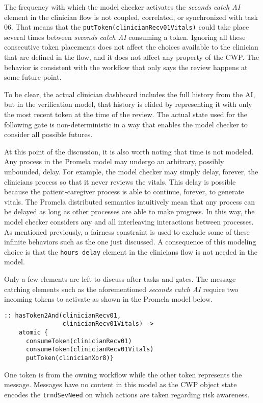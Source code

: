 The frequency with which the model checker activates the \emph{seconds catch AI} element in the clinician flow is not coupled, correlated, or synchronized with task 06.
That means that the \texttt{putToken(clinicianRecv01Vitals)} could take place several times between \emph{seconds catch AI} consuming a token.
Ignoring all these consecutive token placements does not affect the choices available to the clinician that are defined in the flow, and it does not affect any property of the CWP.
The behavior is consistent with the workflow that only says the review happens at some future point.

To be clear, the actual clinician dashboard includes the full history from the AI, but in the verification model, that history is elided by representing it with only the most recent token at the time of the review.
The actual state used for the following gate is non-deterministic in a way that enables the model checker to consider all possible futures.

At this point of the discussion, it is also worth noting that time is not modeled.
Any process in the Promela model may undergo an arbitrary, possibly unbounded, delay.
For example, the model checker may simply delay, forever, the clinicians process so that it never reviews the vitals.
This delay is possible because the patient-caregiver process is able to continue, forever, to generate vitals.
The Promela distributed semantics intuitively mean that any process can be delayed as long as other processes are able to make progress.
In this way, the model checker considers any and all interleaving interactions between processes.
As mentioned previously, a fairness constraint is used to exclude some of these infinite behaviors such as the one just discussed.
A consequence of this modeling choice is that the \texttt{hours delay} element in the clinicians flow is not needed in the model.

Only a few elements are left to discuss after tasks and gates.
The message catching elements such as the aforementioned \textit{seconds catch AI} require two incoming tokens to activate as shown in the Promela model below.
%
{\small
\begin{lstlisting}[style=myPromela]
:: hasToken2And(clinicianRecv01, 
                clinicianRecv01Vitals) -> 
    atomic {
      consumeToken(clinicianRecv01)
      consumeToken(clinicianRecv01Vitals)
      putToken(clinicianXor8)}
\end{lstlisting}
}
%
\noindent One token is from the owning workflow while the other token represents the message.
Messages have no content in this model as the CWP object state encodes the \texttt{trndSevNeed} on which actions are taken regarding risk awareness.

